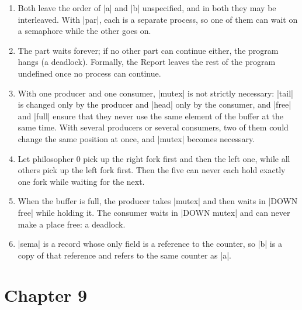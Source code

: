 \begin{enumerate}
\item Both leave the order of \code|a| and \code|b| unspecified, and in
  both they may be interleaved. With \code|par|, each is a separate
  process, so one of them can wait on a semaphore while the other goes on.
\item The part waits forever; if no other part can continue either, the
  program hangs (a deadlock). Formally, the Report leaves the rest of the
  program undefined once no process can continue.
\item With one producer and one consumer, \code|mutex| is not strictly
  necessary: \code|tail| is changed only by the producer and \code|head|
  only by the consumer, and \code|free| and \code|full| ensure that they
  never use the same element of the buffer at the same time. With several
  producers or several consumers, two of them could change the same
  position at once, and \code|mutex| becomes necessary.
\item Let philosopher 0 pick up the right fork first and then the left
  one, while all others pick up the left fork first. Then the five can
  never each hold exactly one fork while waiting for the next.
\item When the buffer is full, the producer takes \code|mutex| and then
  waits in \code|DOWN free| while holding it. The consumer waits in
  \code|DOWN mutex| and can never make a place free: a deadlock.
\item \code|sema| is a record whose only field is a reference to the
  counter, so \code|b| is a copy of that reference and refers to the
  same counter as \code|a|.
\end{enumerate}

\section*{Chapter 9}\label{ans-ch9}


